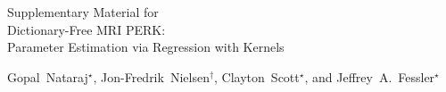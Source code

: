 \documentclass[journal]{./cls/IEEEtran}
\begin{document}

\balance


\pagebreak
\onecolumn
\begin{center}
	\Huge{%
		Supplementary Material for \\
		Dictionary-Free MRI PERK: \\
		Parameter Estimation via Regression with Kernels
	} 
	\vspace{0.5cm}
	
	\Large{%
		Gopal~Nataraj$^\star$, %
		Jon-Fredrik~Nielsen$^\dagger$, %
		Clayton~Scott$^\star$, %
		and %
		Jeffrey~A.~Fessler$^\star$
	}
	\vspace{1cm}
\end{center}





\end{document}
